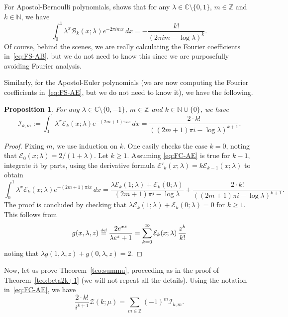 \documentclass[11pt, oneside]{article}
\newcommand{\N}{\mathbb{N}}
\newcommand{\Z}{\mathbb{Z}}
\newcommand{\C}{\mathbb{C}}
\newcommand{\calB}{\mathcal{B}}
\newcommand{\calE}{\mathcal{E}}
\newcommand{\calI}{\mathcal{I}}
\newcommand{\calZ}{\mathcal{Z}}
\theoremstyle{plain}
\newtheorem{proposition}[theorem]{Proposition}
\theoremstyle{definition}
\begin{document}
For Apostol-Bernoulli polynomials, \cite[Proposition~1]{NRV} shows that for any $\lambda \in \C \setminus \{0,1\}$, $m \in \Z$ and $k \in \N$, we have
\begin{equation*}
\int_0^1 \lambda^x \calB_{k}(x;\lambda)e^{-2\pi imx}\,dx
= -\frac{k!}{(2\pi i m - \log \lambda)^{k}}.
\end{equation*}
Of course, behind the scenes, we are really calculating the Fourier coefficients in~\eqref{eq:FS-AB}, but we do not need to know this since we are purposefully avoiding Fourier analysis.

Similarly, for the Apostol-Euler polynomials (we are now computing the Fourier coefficients in~\eqref{eq:FS-AE}, but we do not need to know it), we have the following.

\begin{proposition}
\label{prop:FC-AE}
For any $\lambda \in \C \setminus \{0,-1\}$, $m \in \Z$ and $k \in \N \cup \{0\}$, we have
\begin{equation}
\label{eq:FC-AE}
\calI_{k,m} := \int_0^1 \lambda^x\calE_{k}(x;\lambda)e^{-(2m+1)\pi ix}\,dx
= \frac{2 \cdot k!}{((2m+1)\pi i - \log \lambda)^{k+1}}.
\end{equation}
\end{proposition}

\begin{proof}
Fixing $m$, we use induction on $k$. One easily checks the case $k=0$, noting that
$\calE_0(x;\lambda) = 2/(1+\lambda)$. Let $k \geq 1$. Assuming \eqref{eq:FC-AE} is true for $k-1$, integrate it by parts, using the derivative formula $\calE'_{k}(x;\lambda) = k\calE_{k-1}(x;\lambda)$ to
obtain
\[
\int_0^1 \lambda^x\calE_{k}(x;\lambda)e^{-(2m+1)\pi ix}\,dx
= \frac{\lambda\calE_{k}(1;\lambda)+\calE_{k}(0;\lambda)}{(2m+1)\pi i - \log \lambda}
+ \frac{2\cdot k!}{((2m+1)\pi i - \log \lambda)^{k+1}}.
\]
The proof is concluded by checking that $\lambda\calE_{k}(1;\lambda) + \calE_{k}(0;\lambda) = 0$ for $k \geq 1$. This follows from
\[
g(x,\lambda,z) \stackrel{\text{\tiny def}}{=} \frac{2 e^{xz}}{\lambda e^z+1} 
= \sum_{k=0}^\infty \calE_k(x;\lambda)\, \frac{z^k}{k!}
\]
noting that $\lambda g(1,\lambda,z) + g(0,\lambda,z) = 2$. 
\end{proof}

Now, let us prove Theorem~\ref{teo:summu}, proceeding as in the proof of Theorem~\ref{teo:beta2k+1} (we will not repeat all the details). Using the notation in~\eqref{eq:FC-AE}, we have
\[
  \frac{2\cdot k!}{i^{k+1}} \calZ(k;\mu) =  \sum_{m\in\Z} (-1)^m \calI_{k,m}.
\]
\end{document}
